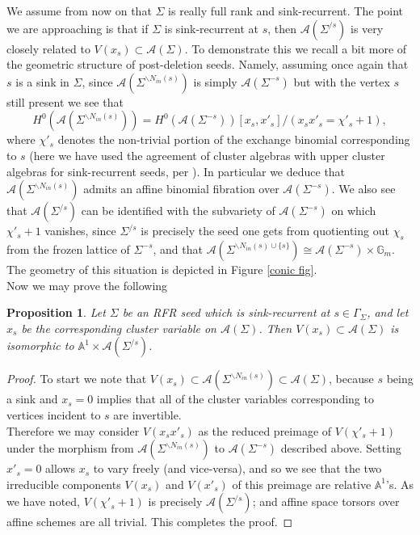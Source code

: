 \documentclass[11pt]{amsart}
\newtheorem{prop}[thm]{Proposition}
\theoremstyle{definition}
\theoremstyle{remark}
\numberwithin{equation}{section}
\begin{document}
We assume from now on that $\Sigma$ is really full rank and sink-recurrent. The point we are approaching is that if $\Sigma$ is sink-recurrent at $s$, then $\mathcal{A}(\Sigma^{/s})$ is very closely related to $V(x_s) \subset \mathcal{A}(\Sigma)$. To demonstrate this we recall a bit more of the geometric structure of post-deletion seeds. Namely, assuming once again that $s$ is a sink in $\Sigma$, since $\mathcal{A}(\Sigma^{\backslash N_{in}(s)})$ is simply $\mathcal{A}(\Sigma^{-s})$ but with the vertex $s$ still present we see that \begin{equation}\label{conic eq}
    H^0(\mathcal{A}(\Sigma^{\backslash N_{in}(s)})) = H^0(\mathcal{A}(\Sigma^{-s}))[x_s, x'_s]/(x_sx'_s = \chi'_s + 1),
\end{equation}
where $\chi'_s$ denotes the non-trivial portion of the exchange binomial corresponding to $s$ (here we have used the agreement of cluster algebras with upper cluster algebras for sink-recurrent seeds, per \cite{MulAU}). In particular we deduce that $\mathcal{A}(\Sigma^{\backslash N_{in}(s)})$ admits an affine binomial fibration over $\mathcal{A}(\Sigma^{-s})$. We also see that $\mathcal{A}(\Sigma^{/s})$ can be identified with the subvariety of $\mathcal{A}(\Sigma^{-s})$ on which $\chi'_s + 1$ vanishes, since $\Sigma^{/s}$ is precisely the seed one gets from quotienting out $\chi_s$ from the frozen lattice of $\Sigma^{-s}$, and that $\mathcal{A}(\Sigma^{\backslash N_{in}(s) \cup \{s\}}) \cong \mathcal{A}(\Sigma^{-s}) \times \mathbb{G}_m$. The geometry of this situation is depicted in Figure \ref{conic fig}.\\

Now we may prove the following

\begin{prop}\label{vanishing locus is linear}
    Let $\Sigma$ be an RFR seed which is sink-recurrent at $s \in \Gamma_\Sigma$, and let $x_s$ be the corresponding cluster variable on $\mathcal{A}(\Sigma)$. Then $V(x_s) \subset \mathcal{A}(\Sigma)$ is isomorphic to $\mathbb{A}^1 \times \mathcal{A}(\Sigma^{/s})$.
\end{prop}

\begin{proof}
    To start we note that $V(x_s) \subset \mathcal{A}(\Sigma^{\backslash N_{in}(s)}) \subset \mathcal{A}(\Sigma)$, because $s$ being a sink and $x_s = 0$ implies that all of the cluster variables corresponding to vertices incident to $s$ are invertible.\\

    Therefore we may consider $V(x_s x'_s)$ as the reduced preimage of $V(\chi'_s + 1)$ under the morphism from $\mathcal{A}(\Sigma^{\backslash N_{in}(s)})$ to $\mathcal{A}(\Sigma^{-s})$ described above. Setting $x'_s = 0$ allows $x_s$ to vary freely (and vice-versa), and so we see that the two irreducible components $V(x_s)$ and $V(x'_s)$ of this preimage are relative $\mathbb{A}^1$'s. As we have noted, $V(\chi'_s + 1)$ is precisely $\mathcal{A}(\Sigma^{/s})$; and affine space torsors over affine schemes are all trivial. This completes the proof.
    \end{proof}
\end{document}
